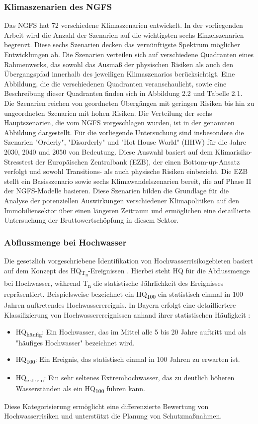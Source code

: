 \subsubsection{Klimaszenarien des NGFS}
Das \ac{NGFS} hat 72 verschiedene Klimaszenarien entwickelt. In der vorliegenden Arbeit wird die Anzahl der Szenarien auf die wichtigsten sechs Einzelszenarien begrenzt. Diese sechs Szenarien decken das vernünftigste Spektrum möglicher Entwicklungen ab. Die Szenarien verteilen sich auf verschiedene Quadranten eines Rahmenwerks, das sowohl das Ausmaß der physischen Risiken als auch den Übergangspfad innerhalb des jeweiligen Klimaszenarios berücksichtigt. Eine Abbildung, die die verschiedenen Quadranten veranschaulicht, sowie eine Beschreibung dieser Quadranten finden sich in Abbildung 2.2 und Tabelle 2.1.
Die Szenarien reichen von geordneten Übergängen mit geringen Risiken bis hin zu ungeordneten Szenarien mit hohen Risiken. Die Verteilung der sechs Hauptszenarien, die vom NGFS vorgeschlagen wurden, ist in der genannten Abbildung dargestellt.
Für die vorliegende Untersuchung sind insbesondere die Szenarien "Orderly", "Disorderly" und "Hot House World" (HHW) für die Jahre 2030, 2040 und 2050 von Bedeutung. Diese Auswahl basiert auf dem Klimarisiko-Stresstest der Europäischen Zentralbank (EZB), der einen Bottom-up-Ansatz verfolgt und sowohl Transitions- als auch physische Risiken einbezieht. Die EZB stellt ein Basisszenario sowie sechs Klimawandelszenarien bereit, die auf Phase II der NGFS-Modelle basieren. Diese Szenarien bilden die Grundlage für die Analyse der potenziellen Auswirkungen verschiedener Klimapolitiken auf den Immobiliensektor über einen längeren Zeitraum und ermöglichen eine detaillierte Untersuchung der Bruttowertschöpfung in diesem Sektor.
\subsubsection{Abflussmenge bei Hochwasser}\label{sec:HQ}
Die gesetzlich vorgeschriebene Identifikation von Hochwasserrisikogebieten basiert auf dem Konzept des HQ\textsubscript{T\textsubscript{n}}-Ereignissen \autocite{WHG73}. Hierbei steht HQ für die Abflussmenge bei Hochwasser, während T\textsubscript{n} die statistische Jährlichkeit des Ereignisses repräsentiert. Beispielsweise bezeichnet ein HQ\textsubscript{100} ein statistisch einmal in 100 Jahren auftretendes Hochwasserereignis.
In Bayern erfolgt eine detailliertere Klassifizierung von Hochwasserereignissen anhand ihrer statistischen Häufigkeit \autocite{BayLfU2019}:
\begin{itemize}
\item HQ\textsubscript{häufig}: Ein Hochwasser, das im Mittel alle 5 bis 20 Jahre auftritt und als "häufiges Hochwasser" bezeichnet wird.
\item HQ\textsubscript{100}: Ein Ereignis, das statistisch einmal in 100 Jahren zu erwarten ist.
\item HQ\textsubscript{extrem}: Ein sehr seltenes Extremhochwasser, das zu deutlich höheren Wasserständen als ein HQ\textsubscript{100} führen kann.
\end{itemize}
Diese Kategorisierung ermöglicht eine differenzierte Bewertung von Hochwasserrisiken und unterstützt die Planung von Schutzmaßnahmen.
